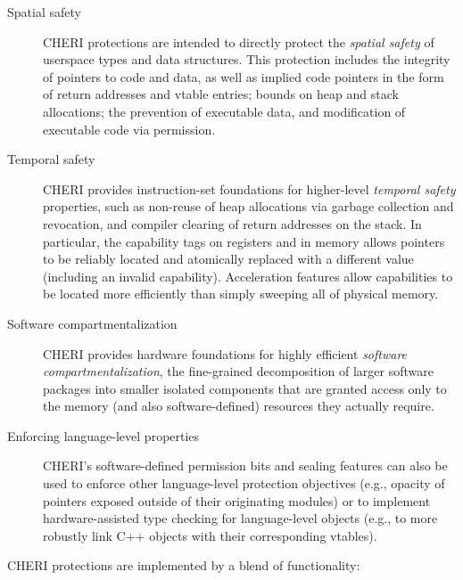 \begin{description}
\item[Spatial safety]
CHERI protections are intended to directly protect the \textit{spatial safety}
of userspace types and data structures.  This protection includes
the integrity of pointers to code and
data, as well as implied code pointers in the form of return addresses and
vtable entries; bounds on heap and stack allocations; the  prevention
of executable data, and modification of executable code via permission.

\item[Temporal safety]
CHERI provides instruction-set foundations for higher-level \textit{temporal
safety} properties, such as non-reuse of heap allocations via garbage
collection and revocation, and compiler clearing of return addresses on the
stack.
In particular, the capability tags on registers and in memory allows pointers
to be reliably located and atomically replaced with a different value
(including an invalid capability).
Acceleration features allow capabilities to be located more efficiently than
simply sweeping all of physical memory.

\item[Software compartmentalization]
CHERI provides hardware foundations for highly efficient
\textit{software compartmentalization}, the fine-grained decomposition of
larger software packages into 
smaller isolated components that are 
granted access
only to the memory (and also software-defined) resources they actually require.

\item[Enforcing language-level properties]
CHERI's software-defined permission bits and sealing features can also be used
to enforce other language-level protection objectives (e.g., opacity of
pointers exposed outside of their originating modules) or to implement
hardware-assisted type checking for language-level objects (e.g., to more
robustly link C++ objects with their corresponding vtables).

\end{description}

\noindent
CHERI protections are implemented by a blend of 
functionality:

